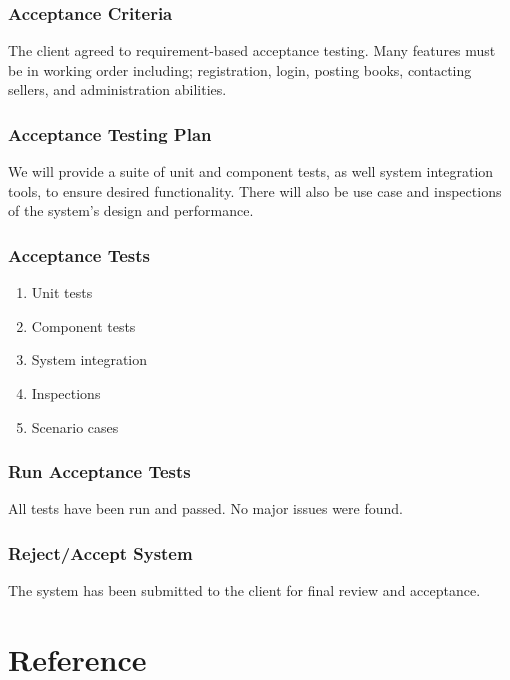 \documentclass[11pt]{article}
\begin{document}
		\subsubsection{Acceptance Criteria}

			The client agreed to requirement-based acceptance testing. 
			Many features must be in working order including; registration, login, posting books, contacting sellers, and administration abilities.

		\subsubsection{Acceptance Testing Plan}

			We will provide a suite of unit and component tests, as well system integration tools, to ensure desired functionality. 
			There will also be use case and inspections of the system's design and performance.

		\subsubsection{Acceptance Tests}
			\begin{enumerate}
				\item Unit tests
				\item Component tests
				\item System integration
				\item Inspections
				\item Scenario cases
			\end{enumerate}

		\subsubsection{Run Acceptance Tests}
			All tests have been run and passed. No major issues were found.

		\subsubsection{Reject/Accept System}
			The system has been submitted to the client for final review and acceptance.
\section{Reference}
\label{sec-reference}
\end{document}
